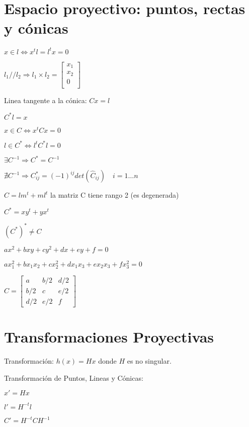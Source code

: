 \documentclass[12pt,a4paper]{article}
\begin{document}
\setlength{\parindent}{0pt} %

\section{Espacio proyectivo: puntos, rectas y c\'onicas}

$x \in l \Leftrightarrow x^{t}l = l^{t} x = 0$

$l_{1} // l_{2} \Rightarrow l_{1} \times l_{2} = \left[ {\begin{smallmatrix}
 x_{1}\\
 x_{2}\\
 0\\
\end{smallmatrix} } \right]
$

Linea tangente a la c\'onica: $C x = l$

$C^{*} l = x$

$x \in C \Leftrightarrow x^{t} C x = 0$


$l \in C^{*} \Leftrightarrow l^{t} C^{*} l = 0$

$ \exists C^{-1} \Rightarrow C^{*} = C^{-1}$

$ \nexists C^{-1} \Rightarrow C_{ij}^{*} = (-1)^{ij} det(\hat{C}_{ij}) \quad i=1\dots n$

$C = lm^{t}+ml^{t}$ la matriz C tiene rango 2 (es degenerada)

$C^{*} = xy^{t}+yx^{t}$

$(C^{*})^{*}  \neq C$

$ax^{2}+bxy+cy^{2}+dx+ey+f = 0$

$ax_{1}^{2}+bx_{1}x_{2}+cx_{2}^{2}+dx_{1}x_{3}+ex_{2}x_{3}+fx_{3}^{2} = 0$


$
C =
\left[ {\begin{smallmatrix}
 a & b/2 & d/2 \\
 b/2 & c & e/2 \\
 d/2 & e/2 & f
\end{smallmatrix} } \right]
$

\section{Transformaciones Proyectivas}

Transformaci\'on: $h(x)= Hx$ donde $H$ es no singular.

Transformaci\'on de Puntos, Lineas y C\'onicas:

$x'= H x$

$l'= H^{-t} l$

$C'= H^{-t} C H^{-1}$
\end{document}
